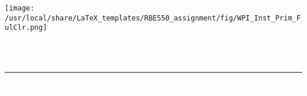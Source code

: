 \documentclass[letterpaper]{article}
\begin{document}



\makeatletter
\def\printauthor{{\large \@author}}
\makeatother


\author{%
\textbf{Daniel Montrallo Flickinger, PhD}%
}


\begin{titlepage}
\BgThispage
{}
\noindent
\vspace*{0.10\textheight}
\texttt{[image: /usr/local/share/LaTeX\_templates/RBE550\_assignment/fig/WPI\_Inst\_Prim\_FulClr.png]}%
\noindent
\begin{flushright}
\textcolor{white}{RBE-550 Path Planning\\%
\Huge\textbf{Assignment: Path Planning}}
\end{flushright}
\vspace*{2cm}\par
\noindent
\begin{minipage}{0.35\linewidth}
 \begin{flushright}
  \textcolor{white}{\printauthor}
 \end{flushright}
\end{minipage} \hspace{15pt}
%
%
\begin{minipage}{0.02\linewidth}
\textcolor{white}{\rule{1pt}{175pt}}
\end{minipage} \hspace{-10pt}
%
\begin{minipage}{0.63\linewidth}
\vspace{5pt}
\textcolor{white}{%
(abstract text)%
}
\end{minipage}
\end{titlepage}
\restoregeometry
\end{document}
